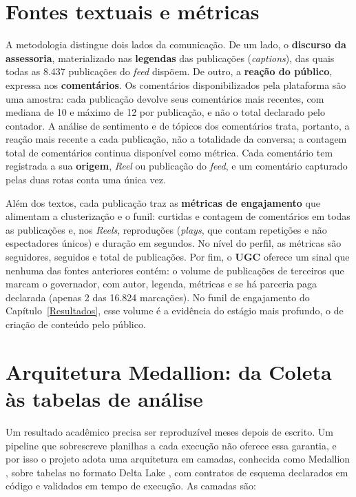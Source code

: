 \section{Fontes textuais e métricas}

A metodologia distingue dois lados da comunicação. De um lado, o \textbf{discurso da assessoria}, materializado nas \textbf{legendas} das publicações (\emph{captions}), das quais todas as 8.437 publicações do \emph{feed} dispõem. De outro, a \textbf{reação do público}, expressa nos \textbf{comentários}. Os comentários disponibilizados pela plataforma são uma amostra: cada publicação devolve seus comentários mais recentes, com mediana de 10 e máximo de 12 por publicação, e não o total declarado pelo contador. A análise de sentimento e de tópicos dos comentários trata, portanto, a reação mais recente a cada publicação, não a totalidade da conversa; a contagem total de comentários continua disponível como métrica. Cada comentário tem registrada a sua \textbf{origem}, \emph{Reel} ou publicação do \emph{feed}, e um comentário capturado pelas duas rotas conta uma única vez.

Além dos textos, cada publicação traz as \textbf{métricas de engajamento} que alimentam a clusterização e o funil: curtidas e contagem de comentários em todas as publicações e, nos \emph{Reels}, reproduções (\emph{plays}, que contam repetições e não espectadores únicos) e duração em segundos. No nível do perfil, as métricas são seguidores, seguidos e total de publicações. Por fim, o \textbf{UGC} oferece um sinal que nenhuma das fontes anteriores contém: o volume de publicações de terceiros que marcam o governador, com autor, legenda, métricas e se há parceria paga declarada (apenas 2 das 16.824 marcações). No funil de engajamento do Capítulo~\ref{Resultados}, esse volume é a evidência do estágio mais profundo, o de criação de conteúdo pelo público.

\section{Arquitetura Medallion: da Coleta às tabelas de análise}

Um resultado acadêmico precisa ser reproduzível meses depois de escrito. Um pipeline que sobrescreve planilhas a cada execução não oferece essa garantia, e por isso o projeto adota uma arquitetura em camadas, conhecida como Medallion \cite{databricks2026}, sobre tabelas no formato Delta Lake \cite{armbrust2020}, com contratos de esquema declarados em código e validados em tempo de execução. As camadas são:

